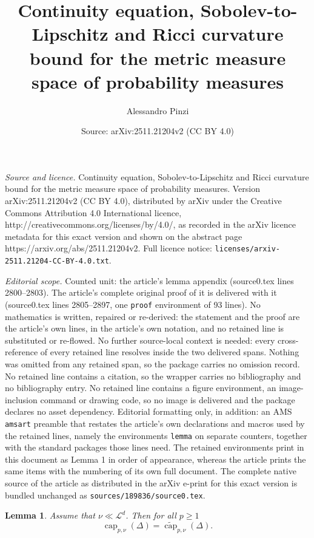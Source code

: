 \documentclass[10pt,a4paper]{amsart}
\title{Continuity equation, Sobolev-to-Lipschitz and Ricci curvature bound for the metric measure space of probability measures}
\author{Alessandro Pinzi}
\date{Source: arXiv:2511.21204v2 (CC BY 4.0)}
\newtheorem{lemma}{Lemma}
\begin{document}
\maketitle

\noindent\emph{Source and licence.} Continuity equation, Sobolev-to-Lipschitz and Ricci curvature bound for the metric measure space of probability measures. Version arXiv:2511.21204v2 (CC BY 4.0), distributed by arXiv under the Creative Commons Attribution 4.0 International licence, http://creativecommons.org/licenses/by/4.0/, as recorded in the arXiv licence metadata for this exact version and shown on the abstract page https://arxiv.org/abs/2511.21204v2. Full licence notice: \texttt{licenses/arxiv-2511.21204-CC-BY-4.0.txt}.\par\smallskip

\noindent\textit{Editorial scope.} Counted unit: the article's lemma appendix (source0.tex lines 2800--2803). The article's complete original proof of it is delivered with it (source0.tex lines 2805--2897, one \texttt{proof} environment of 93 lines). No mathematics is written, repaired or re-derived: the statement and the proof are the article's own lines, in the article's own notation, and no retained line is substituted or re-flowed.  No further source-local context is needed: every cross-reference of every retained line resolves inside the two delivered spans.  Nothing was omitted from any retained span, so the package carries no omission record.  No retained line contains a citation, so the wrapper carries no bibliography and no bibliography entry.  No retained line contains a figure environment, an image-inclusion command or drawing code, so no image is delivered and the package declares no asset dependency.  Editorial formatting only, in addition: an AMS \texttt{amsart} preamble that restates the article's own declarations and macros used by the retained lines, namely the environments \texttt{lemma} on separate counters, together with the standard packages those lines need.  The retained environments print in this document as Lemma 1 in order of appearance, whereas the article prints the same items with the numbering of its own full document.  The complete native source of the article as distributed in the arXiv e-print for this exact version is bundled unchanged as \texttt{sources/189836/source0.tex}.
\begin{lemma}\label{lemma: capacity appendix}
    Assume that $\nu \ll \mathcal{L}^d$. Then for all $p\geq 1$
    \[\operatorname{cap}_{p,\nu}(\Delta) = \widetilde{\operatorname{cap}}_{p,\nu}(\Delta).\]
\end{lemma}
\end{document}
